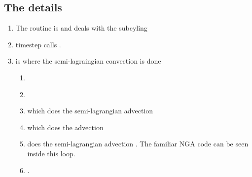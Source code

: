\documentclass[11pt]{article}
\begin{document}
\subsection{The details}
\begin{enumerate}
\item The routine \href{https://github.com/nataraj2/MultiphaseAMReX/blob/master/amrex/Tutorials/Amr/MultiphaseAMR_LJCF/Source/evolve_mod.F90#L197}{} is
\href{https://github.com/nataraj2/MultiphaseAMReX/blob/master/amrex/Tutorials/Amr/MultiphaseAMR_LJCF/Source/evolve_mod.F90#L248}{} and deals with the subcyling 
\item timestep calls \href{https://github.com/nataraj2/MultiphaseAMReX/blob/master/amrex/Tutorials/Amr/MultiphaseAMR_LJCF/Source/evolve_mod.F90#L242}{}.
\item \href{https://github.com/nataraj2/MultiphaseAMReX/blob/master/amrex/Tutorials/Amr/MultiphaseAMR_LJCF/Source/evolve_mod.F90#L260}{} is where the semi-lagraingian convection is done
\begin{enumerate}
\item \href{https://github.com/nataraj2/MultiphaseAMReX/blob/master/amrex/Tutorials/Amr/MultiphaseAMR_LJCF/Source/evolve_mod.F90#L401-L402}{}
\item \href{https://github.com/nataraj2/MultiphaseAMReX/blob/master/amrex/Tutorials/Amr/MultiphaseAMR_LJCF/Source/evolve_mod.F90#L411}{}
\item \href{https://github.com/nataraj2/MultiphaseAMReX/blob/master/amrex/Tutorials/Amr/MultiphaseAMR_LJCF/Source/evolve_mod.F90#L426-L437}{} which does the semi-lagrangian 
advection
\item \href{https://github.com/nataraj2/MultiphaseAMReX/blob/master/amrex/Tutorials/Amr/MultiphaseAMR_LJCF/Source/Src_3d/Adv_3d.f90#L16-L27}{} 
\href{https://github.com/nataraj2/MultiphaseAMReX/blob/master/amrex/Tutorials/Amr/MultiphaseAMR_LJCF/Source/Src_3d/Adv_3d.f90#L111-L122}{} which does the advection 
\item \href{https://github.com/nataraj2/MultiphaseAMReX/blob/master/amrex/Tutorials/Amr/MultiphaseAMR_LJCF/Source/Src_3d/compute_flux_3d.f90#L17-L28}{} does the 
semi-lagrangian advection \href{https://github.com/nataraj2/MultiphaseAMReX/blob/master/amrex/Tutorials/Amr/MultiphaseAMR_LJCF/Source/Src_3d/compute_flux_3d.f90#L87-L89}
{}. The familiar NGA code can be seen inside this loop.
\item \href{https://github.com/nataraj2/MultiphaseAMReX/blob/master/amrex/Tutorials/Amr/MultiphaseAMR_LJCF/Source/Src_3d/Adv_3d.f90#L125-L185}{}.
\end{enumerate}
\end{enumerate}
\end{document}
